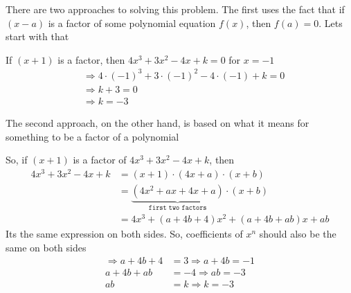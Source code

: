 \begin{solution}[\mcq]
	There are two approaches to solving this problem. The first uses the fact
	that if $(x-a)$ is a factor of some polynomial equation $f(x)$, then $f(a) = 0$.
	Lets start with that
	
	If $(x+1)$ is a factor, then $4x^3+3x^2-4x+k = 0 $ for $x = -1$
	\begin{align}
		& \Rightarrow 4\cdot(-1)^3+3\cdot(-1)^2-4\cdot(-1)+k = 0 \\
		& \Rightarrow k + 3 = 0 \\
		& \Rightarrow k = -3
	\end{align}
	
	The second approach, on the other hand, is based on what it means for something  
	to be a factor of a polynomial
	
	So, if $(x+1)$ is a factor of $4x^3+3x^2-4x+k$, then 
	\begin{align}
		4x^3+3x^2-4x+k &= (x+1)\cdot(4x+a)\cdot(x+b) \\
					   &= \underbrace{(4x^2+ax+4x+a)}_\texttt{first two factors}\cdot(x+b) \\
					   &= 4x^3+(a+4b+4)x^2+(a+4b+ab)x+ab
	\end{align}	 
	Its the same expression on both sides. So, coefficients of $x^n$ should also be 
  the same on both sides
	\begin{align}
		\Rightarrow a+4b+4 &= 3 \Rightarrow a + 4b = -1\\
		            a+4b+ab &= -4 \Rightarrow ab = -3\\
		            ab &= k \Rightarrow k = -3
	\end{align}
	
\end{solution}

